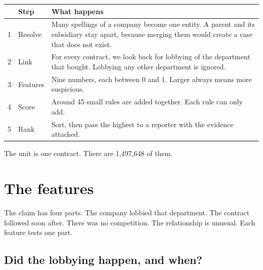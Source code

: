 \documentclass[11pt,a4paper]{article}
\begin{document}
\begin{center}
\begin{tabular}{@{}p{1.0cm}p{2.6cm}p{11.6cm}@{}}
\toprule
& \textbf{Step} & \textbf{What happens} \\
\midrule
1 & Resolve   & Many spellings of a company become one entity. A parent and its
                subsidiary stay apart, because merging them would create a case that
                does not exist. \\
2 & Link      & For every contract, we look back for lobbying of the department that
                bought. Lobbying any other department is ignored. \\
3 & Features  & Nine numbers, each between 0 and 1. Larger always means more
                suspicious. \\
4 & Score     & Around 45 small rules are added together. Each rule can only add. \\
5 & Rank      & Sort, then pass the highest to a reporter with the evidence attached. \\
\bottomrule
\end{tabular}
\end{center}

\vspace{0.3em}

The unit is one contract. There are 1{,}497{,}648 of them.

\section*{The features}

The claim has four parts. The company lobbied that department. The contract followed soon
after. There was no competition. The relationship is unusual. Each feature tests one part.

\subsection*{Did the lobbying happen, and when?}
\end{document}
